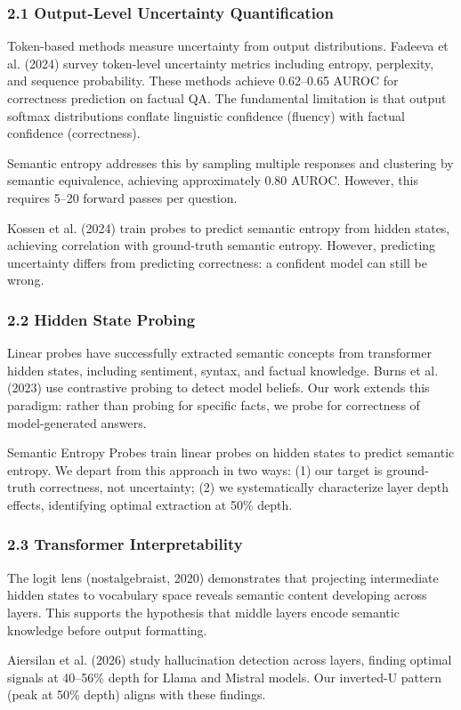 
\subsubsection{2.1 Output-Level Uncertainty Quantification}

Token-based methods measure uncertainty from output distributions. Fadeeva et al. (2024) survey token-level uncertainty metrics including entropy, perplexity, and sequence probability. These methods achieve 0.62--0.65 AUROC for correctness prediction on factual QA. The fundamental limitation is that output softmax distributions conflate linguistic confidence (fluency) with factual confidence (correctness).

Semantic entropy \citep{kuhn2023semantic} addresses this by sampling multiple responses and clustering by semantic equivalence, achieving approximately 0.80 AUROC. However, this requires 5--20 forward passes per question.

Kossen et al. (2024) train probes to predict semantic entropy from hidden states, achieving correlation with ground-truth semantic entropy. However, predicting uncertainty differs from predicting correctness: a confident model can still be wrong.

\subsubsection{2.2 Hidden State Probing}

Linear probes have successfully extracted semantic concepts from transformer hidden states, including sentiment, syntax, and factual knowledge. Burns et al. (2023) use contrastive probing to detect model beliefs. Our work extends this paradigm: rather than probing for specific facts, we probe for correctness of model-generated answers.

Semantic Entropy Probes \citep{kossen2024semantic} train linear probes on hidden states to predict semantic entropy. We depart from this approach in two ways: (1) our target is ground-truth correctness, not uncertainty; (2) we systematically characterize layer depth effects, identifying optimal extraction at 50\% depth.

\subsubsection{2.3 Transformer Interpretability}

The logit lens (nostalgebraist, 2020) demonstrates that projecting intermediate hidden states to vocabulary space reveals semantic content developing across layers. This supports the hypothesis that middle layers encode semantic knowledge before output formatting.

Aiersilan et al. (2026) study hallucination detection across layers, finding optimal signals at 40--56\% depth for Llama and Mistral models. Our inverted-U pattern (peak at 50\% depth) aligns with these findings.

